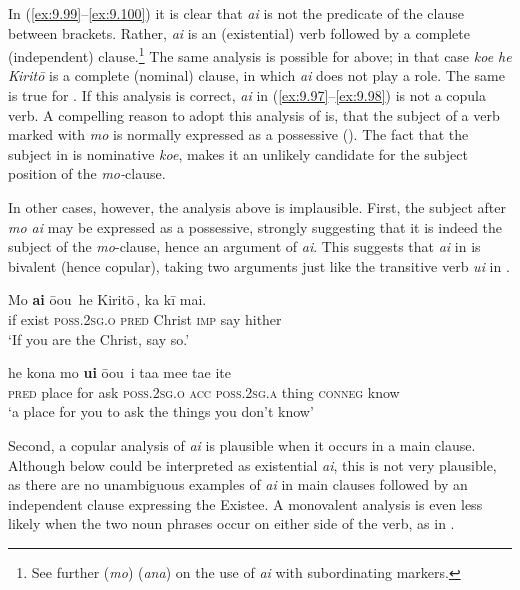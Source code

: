 In (\ref{ex:9.99}–\ref{ex:9.100}) it is clear that \textit{ai} is not the predicate of the clause between brackets. Rather, \textit{ai} is an (existential) verb followed by a complete (independent) clause.\footnote{\label{fn:481}See further  (\textit{mo})  (\textit{ana}) on the use of \textit{ai} with subordinating markers.} The same analysis is possible for  above; in that case \textit{koe he Kiritō} is a complete (nominal) clause, in which \textit{ai} does not play a role. The same is true for . If this analysis is correct, \textit{ai} in (\ref{ex:9.97}–\ref{ex:9.98}) is not a copula verb. A compelling reason to adopt this analysis of  is, that the subject of a verb marked with \textit{mo} is normally expressed as a possessive (). The fact that the subject in  is nominative \textit{koe}, makes it an unlikely candidate for the subject position of the \textit{mo-}clause. 

In other cases, however, the analysis above is implausible. First, the subject after \textit{mo ai} may be expressed as a possessive, strongly suggesting that it is indeed the subject of the \textit{mo}{}-clause, hence an argument of \textit{ai}. This suggests that \textit{ai} in  is bivalent (hence copular), taking two arguments just like the transitive verb \textit{{\ꞌ}ui} in .

\ea\label{ex:9.101}
\gll Mo \textbf{ai} {\ob}ō{\ꞌ}ou\,{\cb} {\ob}he Kiritō\,{\cb}, ka kī mai. \\
if exist {\db}\textsc{poss.2sg.o} {\db}\textsc{pred} Christ \textsc{imp} say hither \\

\glt 
‘If you are the Christ, say so.’ \textstyleExampleref{[Luk. 22:67]}
\z

\ea\label{ex:9.102}
\gll he kona mo \textbf{{\ꞌ}ui} {\ob}ō{\ꞌ}ou\,{\cb} {\ob}i ta{\ꞌ}a me{\ꞌ}e ta{\ꞌ}e {\ꞌ}ite\,{\cb}\\
\textsc{pred} place for ask {\db}\textsc{poss.2sg.o} {\db}\textsc{acc} \textsc{poss.2sg.a} thing \textsc{conneg} know\\

\glt
‘a place for you to ask the things you don’t know’ \textstyleExampleref{[R239.049]} 
\z

Second, a copular analysis of \textit{ai} is plausible when it occurs in a main clause. Although  below could be interpreted as existential \textit{ai}, this is not very plausible, as there are no unambiguous examples of \textit{ai} in main clauses followed by an independent clause expressing the Existee. A monovalent analysis is even less likely when the two noun phrases occur on either side of the verb, as in . 

